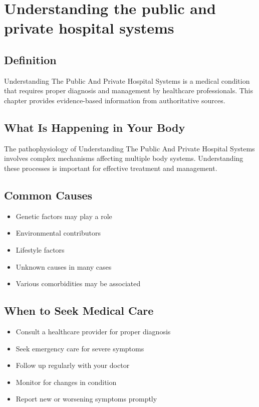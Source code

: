 
\chapter{Understanding the public and private hospital systems}

\section*{Definition}
Understanding The Public And Private Hospital Systems is a medical condition that requires proper diagnosis and management by healthcare professionals. This chapter provides evidence-based information from authoritative sources.

\section*{What Is Happening in Your Body}
The pathophysiology of Understanding The Public And Private Hospital Systems involves complex mechanisms affecting multiple body systems. Understanding these processes is important for effective treatment and management.

\section*{Common Causes}
\begin{itemize}
  \item Genetic factors may play a role
  \item Environmental contributors
  \item Lifestyle factors
  \item Unknown causes in many cases
  \item Various comorbidities may be associated
\end{itemize}

\section*{When to Seek Medical Care}
\begin{itemize}
  \item Consult a healthcare provider for proper diagnosis
  \item Seek emergency care for severe symptoms
  \item Follow up regularly with your doctor
  \item Monitor for changes in condition
  \item Report new or worsening symptoms promptly
\end{itemize}


